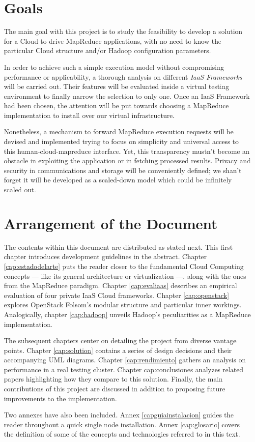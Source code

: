\section{Goals}\label{sec:objetivos}

\noindent The main goal with this project is to study the feasibility to develop a solution for a Cloud to drive MapReduce applications, with no need to know the particular Cloud structure and/or Hadoop configuration parameters.

In order to achieve such a simple execution model without compromising performance or applicability, a thorough analysis on different \emph{IaaS Frameworks} will be carried out. Their features will be evaluated inside a virtual testing environment to finally narrow the selection to only one. Once an IaaS Framework had been chosen, the attention will be put towards choosing a MapReduce implementation to install over our virtual infrastructure.

Nonetheless, a mechanism to forward MapReduce execution requests will be devised and implemented trying to focus on simplicity and universal access to this human-cloud-mapreduce interface. Yet, this transparency mustn't become an obstacle in exploiting the application or in fetching processed results. Privacy and security in communications and storage will be conveniently defined; we shan't forget it will be developed as a scaled-down model which could be infinitely scaled out.



\section{Arrangement of the Document}\label{sec:organizacion}

\noindent The contents within this document are distributed as stated next. This first chapter introduces development guidelines in the abstract. Chapter \ref{cap:estadodelarte} puts the reader closer to the fundamental Cloud Computing concepts --- like its general architecture or virtualization ---, along with the ones from the MapReduce paradigm. Chapter \ref{cap:evaliaas} describes an empirical evaluation of four private IaaS Cloud frameworks. Chapter \ref{cap:openstack} explores OpenStack Folsom's modular structure and particular inner workings. Analogically, chapter \ref{cap:hadoop} unveils Hadoop's peculiarities as a MapReduce implementation.

The subsequent chapters center on detailing the project from diverse vantage points. Chapter \ref{cap:solution} contains a series of design decisions and their accompanying UML diagrams. Chapter \ref{cap:rendimiento} gathers an analysis on performance in a real testing cluster. Chapter {cap:conclusiones} analyzes related papers highlighting how they compare to this solution. Finally, the main contributions of this project are discussed in addition to proposing future improvements to the implementation.

Two annexes have also been included. Annex \ref{capguiainstalacion} guides the reader throughout a quick single node installation. Annex \ref{cap:glosario} covers the definition of some of the concepts and technologies referred to in this text.
